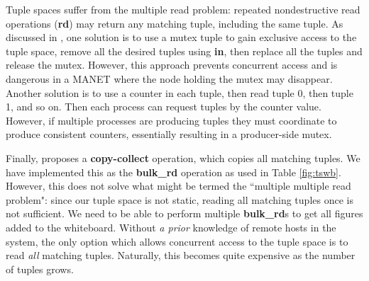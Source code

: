 \documentclass{llncs}
\begin{document}
Tuple spaces suffer from the multiple read problem\cite{mrdp}: repeated nondestructive read operations (\textbf{rd}) may return any matching tuple, including the same tuple. As discussed in \cite{mrdp}, one solution is to use a mutex tuple to gain exclusive access to the tuple space, remove all the desired tuples using \textbf{in}, then replace all the tuples and release the mutex. However, this approach prevents concurrent access and is dangerous in a MANET where the node holding the mutex may disappear. Another solution is to use a counter in each tuple, then read tuple 0, then tuple 1, and so on. Then each process can request tuples by the counter value. However, if multiple processes are producing tuples they must coordinate to produce consistent counters, essentially resulting in a producer-side mutex.

Finally, \cite{mrdp} proposes a \textbf{copy-collect} operation, which copies all matching tuples. We have implemented this as the \textbf{bulk\_rd} operation as used in Table \ref{fig:tswb}. However, this does not solve what might be termed the ``multiple multiple read problem": since our tuple space is not static, reading all matching tuples once is not sufficient. We need to be able to perform multiple \textbf{bulk\_rd}s to get all figures added to the whiteboard. Without \textit{a prior} knowledge of remote hosts in the system, the only option which allows concurrent access to the tuple space is to read \textit{all} matching tuples. Naturally, this becomes quite expensive as the number of tuples grows. 
\end{document}
